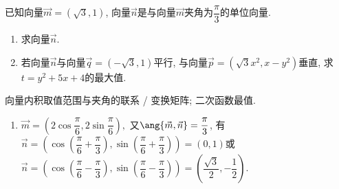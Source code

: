 \documentclass[8pt]{article}
\begin{document}
		\begin{easonbigproblem}
			已知向量\(\vec{m} = (\sqrt{3}, 1)\), 向量\(\vec{n}\)是与向量\(\vec{m}\)夹角为\(\dfrac{\pi}{3}\)的单位向量.
			\begin{enumerate} [label = \calword{(\arabic*)}]
				\item 求向量\(\vec{n}\).
				\item 若向量\(\vec{n}\)与向量\(\vec{q} = \left(-\sqrt{3}, 1\right)\)平行, 与向量\(\vec{p} = \left(\sqrt{3} x^2, x - y^2\right)\)垂直, 求\(t = y^2 + 5x + 4\)的最大值.
			\end{enumerate}
			\subbigproblem
			 向量内积取值范围与夹角的联系 / 变换矩阵; 二次函数最值.
			\begin{enumerate} [label = \calword{(\arabic*)}]
				\item	{} \(\vec{m} = \left(2 \cos \dfrac{\pi}{6}, 2 \sin \dfrac{\pi}{6}\right),\) 又\(\ang{\vec{m}, \vec{n}}=\dfrac{\pi}{3}\), 有\(\vec{n} = \left(\cos \left(\dfrac{\pi}{6} + \dfrac{\pi}{3}\right), \sin \left(\dfrac{\pi}{6} + \dfrac{\pi}{3}\right)\right) = (0, 1)\)或\(\vec{n} = \left(\cos \left(\dfrac{\pi}{6} - \dfrac{\pi}{3}\right), \sin \left(\dfrac{\pi}{6} - \dfrac{\pi}{3}\right)\right) = \left(\dfrac{\sqrt{3}}{2}, -\dfrac{1}{2}\right)\).
    

\end{enumerate}
\end{easonbigproblem}
\end{document}

